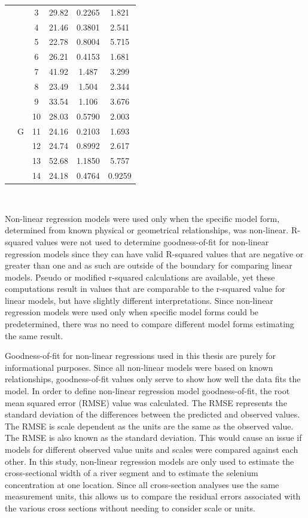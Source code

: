 \begin{linenumbers}
\begin{table}[htbp]
\begin{tabular}{cccccc}
		&						& 3 & 29.82 & 0.2265 & 1.821\\
		& 						& 4 & 21.46 & 0.3801 & 2.541\\
		&						& 5 & 22.78 & 0.8004 & 5.715\\
		&						& 6 & 26.21 & 0.4153 & 1.681\\
		&						& 7 & 41.92 & 1.487 & 3.299\\ \cmidrule(l{0.5em}r){2-6}
		& \multirow{7}[2]{*}{G} & 8 & 23.49 & 1.504 & 2.344\\
		&						& 9 & 33.54 & 1.106 & 3.676\\
		&						& 10& 28.03 & 0.5790 & 2.003\\
		&						& 11& 24.16 & 0.2103 & 1.693\\
		&						& 12& 24.74 & 0.8992 & 2.617\\
		&						& 13& 52.68 & 1.1850 & 5.757\\
		&						& 14& 24.18 & 0.4764 & 0.9259\\
		\bottomrule
	\end{tabular}\\
\end{table}

Non-linear regression models were used only when the specific model form, determined from known physical or geometrical relationships, was non-linear.  R-squared values were not used to determine goodness-of-fit for non-linear regression models since they can have valid R-squared values that are negative or greater than one \parencite{spiess2010} and as such are outside of the boundary for comparing linear models.  Pseudo or modified r-squared calculations are available, yet these computations result in values that are comparable to the r-squared value for linear models, but have slightly different interpretations.  Since non-linear regression models were used only when specific model forms could be predetermined, there was no need to compare different model forms estimating the same result.

Goodness-of-fit for non-linear regressions used in this thesis are purely for informational purposes.  Since all non-linear models were based on known relationships, goodness-of-fit values only serve to show how well the data fits the model.  In order to define non-linear regression model goodness-of-fit, the root mean squared error (RMSE) value was calculated.  The RMSE represents the standard deviation of the differences between the predicted and observed values.  The RMSE is scale dependent as the units are the same as the observed value.  The RMSE is also known as the standard deviation.  This would cause an issue if models for different observed value units and scales were compared against each other.  In this study, non-linear regression models are only used to estimate the cross-sectional width of a river segment and to estimate the selenium concentration at one location.  Since all cross-section analyses use the same measurement units, this allows us to compare the residual errors associated with the various cross sections without needing to consider scale or units.


\end{linenumbers}
